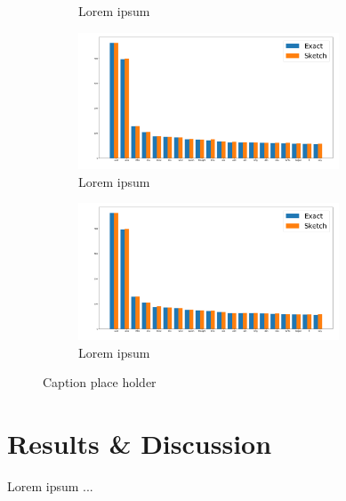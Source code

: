 \documentclass[shortpaper]{revdetua}
\begin{document}
\begin{figure}[]
\begin{subfigure}[t]{0.5\textwidth}
        \caption{Lorem ipsum}
    \end{subfigure}
    \begin{subfigure}[t]{0.5\textwidth}
        \includegraphics[height=1.6in]{englishAlice1000_8.png}
        \caption{Lorem ipsum}
    \end{subfigure}
    \begin{subfigure}[t]{0.5\textwidth}
        \includegraphics[height=1.6in]{englishAlice1000_10.png}
        \caption{Lorem ipsum}
    \end{subfigure}
    \caption{Caption place holder}
\end{figure}

\section{Results \& Discussion}

Lorem ipsum ...

\end{document}
